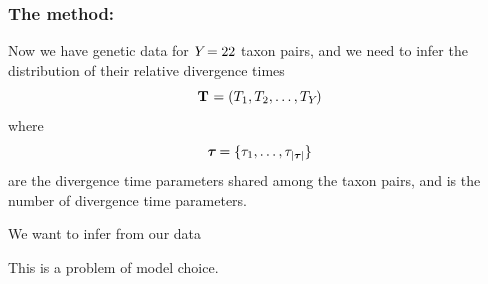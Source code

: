 \begin{frame}
    \frametitle{The method: \msb}
        Now we have genetic data for $Y_{}=22$ taxon pairs, and we need to
        infer the distribution of their relative divergence times
        \[
            \mathbf{T_{}} = (T_{1},T_{2},\ldots,T_{Y_{}})
        \]
        where
        \[
            \boldsymbol{\tau_{}} = \{\tau_{1},\ldots,\tau_{\lvert \boldsymbol{\tau_{}} \rvert}\}
        \]
        are the divergence time parameters shared among the taxon pairs, and
        \divTimeNum is the number of divergence time parameters.

        \begin{myitemize}
            \item We want to infer \divTimeMapVector from our data
            \item This is a problem of model choice.
        \end{myitemize}
\end{frame}

